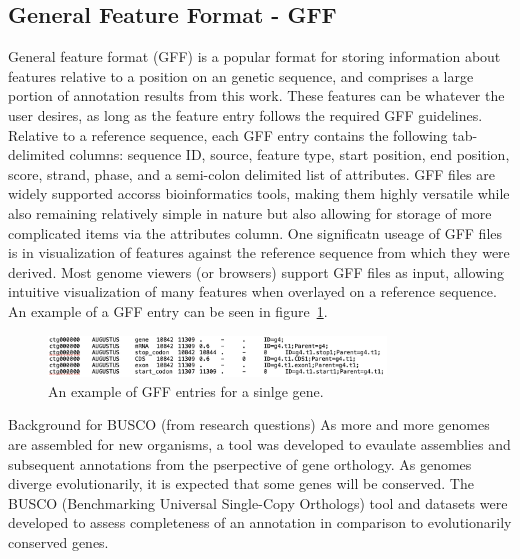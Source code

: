 \subsection{General Feature Format - GFF}
General feature format (GFF) is a popular format for storing
information about features relative to a position on an genetic
sequence, and comprises a large portion of annotation results from
this work. These features can be whatever the user desires, as long as
the feature entry follows the required GFF guidelines. Relative to a
reference sequence, each GFF entry contains the following
tab-delimited columns: sequence ID, source, feature type, start
position, end position, score, strand, phase, and a semi-colon
delimited list of attributes. GFF files are widely supported accorss
bioinformatics tools, making them highly versatile while also
remaining relatively simple in nature but also allowing for storage of
more complicated items via the attributes column. One significatn
useage of GFF files is in visualization of features against the
reference sequence from which they were derived. Most genome viewers
(or browsers) support GFF files as input, allowing intuitive
visualization of many features when overlayed on a reference
sequence. An example of a GFF entry can be seen in
figure~\ref{fig:gff-example}.

\begin{figure}
  \centering
  \includegraphics[width=0.8\textwidth]{figures/gff-example.png}
  \caption{An example of GFF entries for a sinlge gene.}
  \label{fig:gff-example}
\end{figure}

Background for BUSCO (from research questions)
As more and more genomes are assembled for new organisms, a tool was
developed to evaulate assemblies and subsequent annotations from the
pserpective of gene orthology. As genomes diverge evolutionarily, it
is expected that some genes will be conserved. The BUSCO (Benchmarking
Universal Single-Copy Orthologs) tool and datasets were developed to
assess completeness of an annotation in comparison to evolutionarily
conserved genes.

